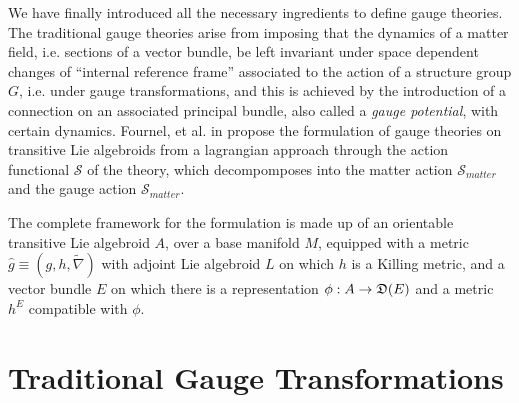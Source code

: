 We have finally introduced all the necessary ingredients to define gauge theories. The traditional gauge theories arise from imposing that the dynamics of a matter field, i.e. sections of a vector bundle, be left invariant under space dependent changes of ``internal reference frame'' associated to the action of a structure group $G$, i.e. under gauge transformations, and this is achieved by the introduction of a connection on an associated principal bundle, also called a \emph{gauge potential}, with certain dynamics. Fournel, et al. in \cite{Fournel2013} propose the formulation of gauge theories on transitive Lie algebroids from a lagrangian approach through the action functional $\mathcal S$ of the theory, which decompomposes into the matter action $\mathcal S_{matter}$ and the gauge action $\mathcal S_{matter}$. 

The complete framework for the formulation is made up of an orientable transitive Lie algebroid $A$, over a base manifold $M$, equipped with a metric $\hat g \equiv (g, h, \tilde \nabla)$ with adjoint Lie algebroid $L$ on which $h$ is a Killing metric, and a vector bundle $E$ on which there is a representation $\phi: A \to \alg D(E)$ and a metric $h^E$ compatible with $\phi$.

\section{Traditional Gauge Transformations}








